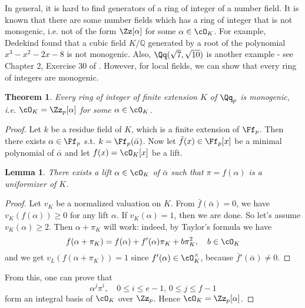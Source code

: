 \documentclass{article}
\newtheorem{theorem}{Theorem}
\newtheorem{lemma}{Lemma}
\begin{document}
In general, it is hard to find generators of a ring of integer of a number field. It is known that there are some number fields which has a ring of integer that is not monogenic, i.e. not of the form $\Zz[\alpha]$ for some $\alpha\in \cO_{K}$. 
For example, Dedekind found that a cubic field $K/\mathbb{Q}$ generated by a root of the polynomial $x^{3} - x^{2} - 2x - 8$ is not monogenic. Also, $\Qq(\sqrt{7}, \sqrt{10})$ is another example - see Chapter 2, Exercise 30 of \cite{ma}.
However, for local fields, we can show that every ring of integers are monogenic. 
\begin{theorem}
Every ring of integer of finite extension $K$ of $\Qq_{p}$ is monogenic, i.e. $\cO_{K} = \Zz_{p}[\alpha]$ for some $\alpha\in \cO_{K}$. 
\end{theorem}
\begin{proof}
Let $k$ be a residue field of $K$, which is a finite extension of $\Ff_{p}$. Then there exists $\alpha\in \Ff_{p}$ s.t. $k = \Ff_{p}(\bar{\alpha})$. 
Now let $\bar{f}(x)\in \Ff_{p}[x]$ be a minimal polynomial of $\bar{\alpha}$ and let $f(x) = \cO_{K}[x]$ be a lift. 
\begin{lemma}
There exists a lift $\alpha\in \cO_K$ of $\bar{\alpha}$ such that $\pi = f(\alpha)$ is a uniformizer of $K$. 
\end{lemma}
\begin{proof}
Let $v_{K}$ be a normalized valuation on $K$. 
From $\bar{f}(\bar{\alpha}) = 0$, we have $v_{K}(f(\alpha))\geq 0$ for any lift $\alpha$. 
If $v_{K}(\alpha) = 1$, then we are done. So let's assume $v_{K}(\alpha) \geq 2$. 
Then $\alpha +\pi_{K}$ will work: indeed, by Taylor's formula we have
$$
f(\alpha + \pi_{K}) = f(\alpha) + f'(\alpha)\pi_{K} + b\pi_{K}^{2}, \quad b\in \cO_{K}
$$
and we get $v_{L}(f(\alpha+ \pi_{K})) = 1$ since $f'(\alpha) \in \cO_{K}^{\times}$, because $\bar{f}'(\bar{\alpha})\neq 0$.
\end{proof}
From this, one can prove that 
$$
\alpha^{j}\pi^{i}, \quad 0\leq i\leq e-1,\, 0\leq j\leq f-1
$$
form an integral basis of $\cO_{K}$ over $\Zz_{p}$. Hence $\cO_{K} =\Zz_{p}[\alpha]$. 
\end{proof}
\end{document}
